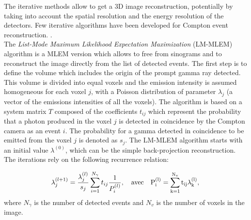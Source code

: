 The iterative methods allow to get a 3D image reconstruction, potentially by taking into account the spatial resolution and the energy resolution of the detectors. Few iterative algorithms have been developed for Compton event reconstruction. \cite{schone_common_2010, zoglauer_design_2011,gillam_compton_2011,mackin_evaluation_2012,lojacono_low_2013}.\\
The \textit{List-Mode Maximum Likelihood Expectation Maximization} (LM-MLEM) algorithm is a MLEM version which allows to free from sinograms and to reconstruct the image directly from the list of detected events.
The first step is to define the volume which includes the origin of the prompt gamma ray detected. This volume is divided into equal voxels and the emission intensity is assumed homogeneous for each voxel $j$, with a Poisson distribution of parameter $\lambda_j$ (a vector of the emissions intensities of all the voxels). The algorithm is based on a system matrix $T$ composed of the coefficients  $t_{ij}$ which represent the probability that a photon produced in the voxel $j$ is detected in coincidence by the Compton camera as an event $i$. The probability for a gamma detected in coincidence to be emitted from the voxel $j$ is denoted as $s_j$.
The LM-MLEM algorithm starts with an initial value $\lambda^{(0)}$, which can be the simple back-projection reconstruction.
The iterations rely on the following recurrence relation:

\begin{equation}
\lambda_j^{(l+1)} =  \frac{\lambda_j^{(l)} }{s_j} \sum\limits_{i=1}^{N_{\gamma}} t_{ij} \frac{1}{P_i^{(l)}},\quad \rm{avec}\quad  P_i^{(l)}=\sum\limits_{k=1}^{N_{v}} t_{ij}\lambda_k^{(l)},
 \label{eq:equation_lambda_compton_med_nucleaire}\newline
\end{equation}
where $N_{\gamma}$ is the number of detected events and $N_v$ is the number of voxels in the image.\newline

